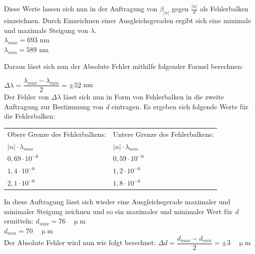 \documentclass[12pt,a4paper,titlepage,headinclude,bibtotoc]{scrartcl}
\begin{document}
\begin{flushleft}
Diese Werte lassen sich nun in der Auftragung von $ \beta_{|n|} $ gegen $ \frac{|n|}{d} $ als Fehlerbalken einzeichnen. Durch Einzeichnen einer Ausgleichsgeraden ergibt sich eine minimale und maximale Steigung von $ \lambda $.\\
\vspace{0,5 cm}
$ \lambda_{max} = 693$ nm\\
$ \lambda_{min} = 589 $ nm\\
\vspace{0,5 cm}


Daraus lässt sich nun der Absolute Fehler mithilfe folgender Formel berechnen:\\
\vspace{0,5 cm}

$ \Delta \lambda = \dfrac{ \lambda_{max}-\lambda_{min}}{2}= \pm 52 $ nm\\
\vspace{0,5 cm}
Der Fehler von $ \Delta \lambda $ lässt sich nun in Form von Fehlerbalken in die zweite Auftragung zur Bestimmung von \emph{d} eintragen. Es ergeben sich folgende Werte für die Fehlerbalken:
\vspace{3 cm}

\begin{table} [h]
\centering
\begin{tabular}{|p{6 cm}|p{6 cm}|}
		\hline
         Obere Grenze des Fehlerbalkens: & Untere Grenze des Fehlerbalkens: \\
         
         $ {|n|} \cdot {\lambda_{max}} $ & $ {|n|} \cdot {\lambda_{min}} $ \\
         \hline
         ${0,69} \cdot {10^{-6}} $& ${0,59} \cdot {10^{-6}} $ \\
         \hline
         ${1,4} \cdot {10^{-6}} $& ${1,2} \cdot {10^{-6}} $\\
         \hline
         ${2,1} \cdot {10^{-6}} $&${1,8} \cdot {10^{-6}} $ \\
         \hline
\end{tabular}
\end{table}
 
In diese Auftragung lässt sich wieder eine Ausgleichsgerade maximaler und minimaler Steigung zeichnen und so ein maximaler und minimaler Wert für \emph{d} ermitteln:
$ d_{max} = 76  \quad \mathrm{\upmu m}$ \\
$ d_{min} = 70 \quad \mathrm{\upmu m} $\\
Der Absolute Fehler wird nun wie folgt berechnet:
$ \Delta d = \dfrac{ d_{max}-d_{min}}{2}= \pm 3 \quad \mathrm{\upmu m} $\\
\end{flushleft}
\end{document}
